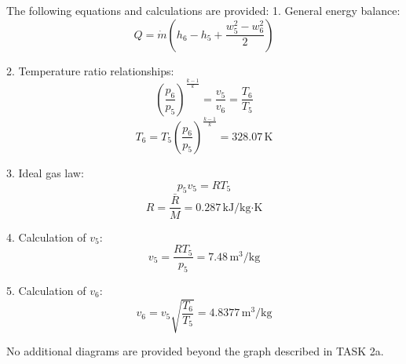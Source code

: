 The following equations and calculations are provided:  
1. General energy balance:  
\[
Q = \dot{m} \left( h_6 - h_5 + \frac{w_5^2 - w_6^2}{2} \right)
\]  

2. Temperature ratio relationships:  
\[
\left( \frac{p_6}{p_5} \right)^{\frac{k-1}{k}} = \frac{v_5}{v_6} = \frac{T_6}{T_5}
\]  
\[
T_6 = T_5 \left( \frac{p_6}{p_5} \right)^{\frac{k-1}{k}} = 328.07 \, \text{K}
\]  

3. Ideal gas law:  
\[
p_5 v_5 = R T_5
\]  
\[
R = \frac{\bar{R}}{M} = 0.287 \, \text{kJ}/\text{kg·K}
\]  

4. Calculation of \( v_5 \):  
\[
v_5 = \frac{R T_5}{p_5} = 7.48 \, \text{m}^3/\text{kg}
\]  

5. Calculation of \( v_6 \):  
\[
v_6 = v_5 \sqrt{\frac{T_6}{T_5}} = 4.8377 \, \text{m}^3/\text{kg}
\]  

No additional diagrams are provided beyond the graph described in TASK 2a.